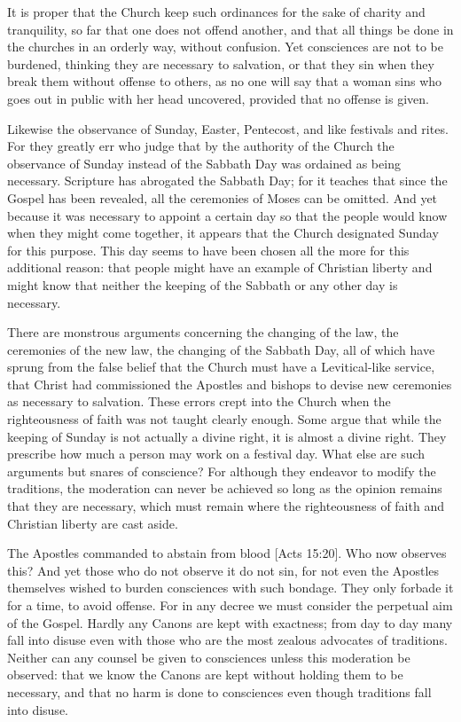 It is proper that the Church keep such ordinances for the sake of charity and tranquility, so far that one does not offend another, and that all things be done in the churches in an orderly way, without confusion. Yet consciences are not to be burdened, thinking they are necessary to salvation, or that they sin when they break them without offense to others, as no one will say that a woman sins who goes out in public with her head uncovered, provided that no offense is given.

Likewise the observance of Sunday, Easter, Pentecost, and like festivals and rites. For they greatly err who judge that by the authority of the Church the observance of Sunday instead of the Sabbath Day was ordained as being necessary. Scripture has abrogated the Sabbath Day; for it teaches that since the Gospel has been revealed, all the ceremonies of Moses can be omitted. And yet because it was necessary to appoint a certain day so that the people would know when they might come together, it appears that the Church designated Sunday for this purpose. This day seems to have been chosen all the more for this additional reason: that people might have an example of Christian liberty and might know that neither the keeping of the Sabbath or any other day is necessary.

There are monstrous arguments concerning the changing of the law, the ceremonies of the new law, the changing of the Sabbath Day, all of which have sprung from the false belief that the Church must have a Levitical-like service, that Christ had commissioned the Apostles and bishops to devise new ceremonies as necessary to salvation. These errors crept into the Church when the righteousness of faith was not taught clearly enough. Some argue that while the keeping of Sunday is not actually a divine right, it is almost a divine right. They prescribe how much a person may work on a festival day. What else are such arguments but snares of conscience? For although they endeavor to modify the traditions, the moderation can never be achieved so long as the opinion remains that they are necessary, which must remain where the righteousness of faith and Christian liberty are cast aside.

The Apostles commanded to abstain from blood [Acts 15:20]. Who now observes this? And yet those who do not observe it do not sin, for not even the Apostles themselves wished to burden consciences with such bondage. They only forbade it for a time, to avoid offense. For in any decree we must consider the perpetual aim of the Gospel. Hardly any Canons are kept with exactness; from day to day many fall into disuse even with those who are the most zealous advocates of traditions. Neither can any counsel be given to consciences unless this moderation be observed: that we know the Canons are kept without holding them to be necessary, and that no harm is done to consciences even though traditions fall into disuse.

